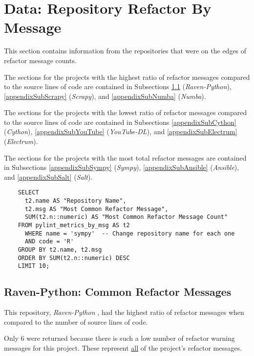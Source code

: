 \newpage
\section{Data: Repository Refactor By Message} \label{appendixRefactorMsgCounts}

This section contains information from the repositories that were on the edges of refactor message counts.

The sections for the projects with the highest ratio of refactor messages compared to the source lines of code are contained in Subsections \ref{appendixSubRavenPython} (\emph{Raven-Python}), \ref{appendixSubScrapy} (\emph{Scrapy}), and \ref{appendixSubNumba} (\emph{Numba}).

The sections for the projects with the lowest ratio of refactor messages compared to the source lines of code are contained in Subsections \ref{appendixSubCython} (\emph{Cython}), \ref{appendixSubYouTube} (\emph{YouTube-DL}), and \ref{appendixSubElectrum} (\emph{Electrum}).

The sections for the projects with the most total refactor messages are contained in Subsections \ref{appendixSubSympy} (\emph{Sympy}),  \ref{appendixSubAnsible} (\emph{Ansible}), and \ref{appendixSubSalt} (\emph{Salt}).

\begin{singlespace}
  \begin{verbatim}
    SELECT
      t2.name AS "Repository Name",
      t2.msg AS "Most Common Refactor Message",
      SUM(t2.n::numeric) AS "Most Common Refactor Message Count"
    FROM pylint_metrics_by_msg AS t2
      WHERE name = 'sympy'  -- Change repository name for each one
      AND code = 'R'
    GROUP BY t2.name, t2.msg
    ORDER BY SUM(t2.n::numeric) DESC
    LIMIT 10;
  \end{verbatim}
\end{singlespace}


\newpage
\subsection{Raven-Python: Common Refactor Messages} \label{appendixSubRavenPython}
This repository, \emph{Raven-Python} \cite{data:raven-python}, had the highest ratio of refactor messages when compared to the number of source lines of code.

Only 6 were returned because there is such a low number of refactor warning messages for this project. These represent \underline{all} of the project's refactor messages.

